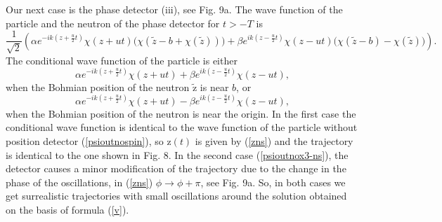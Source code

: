 \documentclass[preprint,tightenlines]{elsarticle}
\begin{document}
Our next case is the phase detector (iii), see Fig. 9a. The wave function of the
particle and the neutron of the phase detector for $t>-T$ is
 \begin{equation}
\frac{1}{\sqrt{2}}\left(\alpha e^{-ik(z+\frac{u}{2}t)}\chi(z+ut)\Big(\chi(\tilde{z}-b+\chi(\tilde{z}))\Big)+\beta e^{ik(z-\frac{u}{2}t)}\chi(z-ut)\Big(\chi(\tilde{z}-b)-\chi(\tilde{z})\Big)\right).\label{psioutnox3ns}
\end{equation}
 The conditional wave function of the particle is either
  \begin{equation}
\alpha e^{-ik(z+\frac{u}{2}t)}\chi(z+ut)+\beta e^{ik(z-\frac{u}{2}t)}\chi(z-ut),\label{psioutnox3+ns}
\end{equation}
 when the Bohmian position of the neutron $\tilde{\mathrm{z}}$ is near $b$, or
 \begin{equation}
\alpha e^{-ik(z+\frac{u}{2}t)}\chi(z+ut)-\beta e^{ik(z-\frac{u}{2}t)}\chi(z-ut),\label{psioutnox3-ns}
\end{equation}
 when the Bohmian position of the neutron is near the origin. In the first
case the conditional wave function is identical to the wave function
of the particle without position detector (\ref{psioutnospin}),
so $\mathrm{z}(t)$ is given by (\ref{zns}) and the trajectory is identical to the one shown in Fig. 8.
In the second case (\ref{psioutnox3-ns}), the detector causes
a minor modification of the trajectory due to the change in the phase of  the oscillations,
in (\ref{zns}) $\phi\rightarrow\phi+\pi$, see Fig. 9a. So, in both cases we get surrealistic
trajectories with small oscillations around the solution obtained on the basis of formula (\ref{v}).
\end{document}
